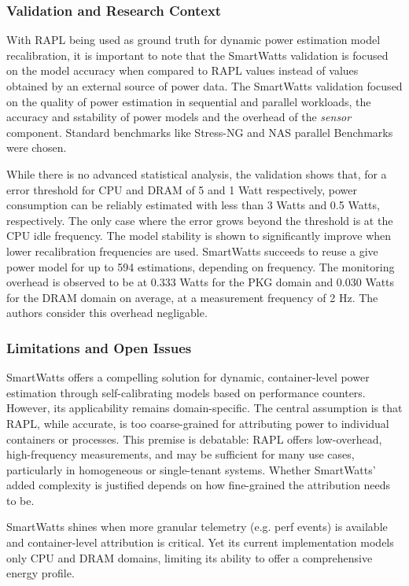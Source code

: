 \subsubsection{Validation and Research Context}
\label{sec:smartwatts-validation}
With RAPL being used as ground truth for dynamic power estimation model recalibration, it is important to note that the SmartWatts validation is focused on the model accuracy when compared to RAPL values instead of values obtained by an external source of power data. The SmartWatts validation focused on the quality of power estimation in sequential and parallel workloads, the accuracy and sstability of power models and the overhead of the \textit{sensor} component. Standard benchmarks like Stress-NG and NAS parallel Benchmarks were chosen. 

While there is no advanced statistical analysis, the validation shows that, for a error threshold for CPU and DRAM of 5 and 1 Watt respectively, power consumption can be reliably estimated with less than 3 Watts and 0.5 Watts, respectively. The only case where the error grows beyond the threshold is at the CPU idle frequency. The model stability is shown to significantly improve when lower recalibration frequencies are used. SmartWatts succeeds to reuse a give power model for up to 594 estimations, depending on frequency. The monitoring overhead is observed to be at 0.333 Watts for the PKG domain and 0.030 Watts for the DRAM domain on average, at a measurement frequency of 2 Hz. The authors consider this overhead negligable.
\subsubsection{Limitations and Open Issues}
\label{sec:smartwatts-limitations}
SmartWatts offers a compelling solution for dynamic, container-level power estimation through self-calibrating models based on performance counters. However, its applicability remains domain-specific. The central assumption is that RAPL, while accurate, is too coarse-grained for attributing power to individual containers or processes. This premise is debatable: RAPL offers low-overhead, high-frequency measurements, and may be sufficient for many use cases, particularly in homogeneous or single-tenant systems. Whether SmartWatts' added complexity is justified depends on how fine-grained the attribution needs to be.

SmartWatts shines when more granular telemetry (e.g. perf events) is available and container-level attribution is critical. Yet its current implementation models only CPU and DRAM domains, limiting its ability to offer a comprehensive energy profile.

